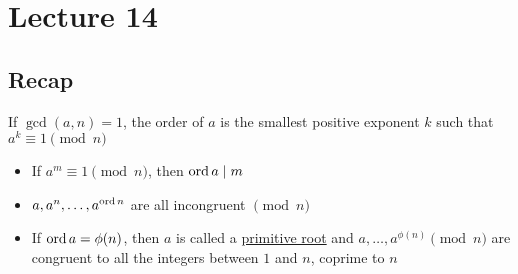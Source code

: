 \chapter{Lecture 14}
\date{October 15, 2024}

\section{Recap}
    If $\gcd(a,n) = 1$, the order of $a$ is the smallest positive exponent
    $k$ such that $a^k\equiv 1\pmod{n}$
    \begin{itemize}
        \item If $a^m\equiv 1\pmod{n}$, then $\operatorname{ord}{a}\mid m$
        \item $a,a^n,\dots,a^{\operatorname{ord}{n}}$ are all incongruent $\pmod{n}$
        \item If $\operatorname{ord}{a}=\phi(n)$, then $a$ is called a \underline{primitive root} and
        $a,\dots,a^{\phi(n)}\pmod{n}$ are congruent to all the integers between $1$ and $n$, 
        coprime to $n$
    \end{itemize}

